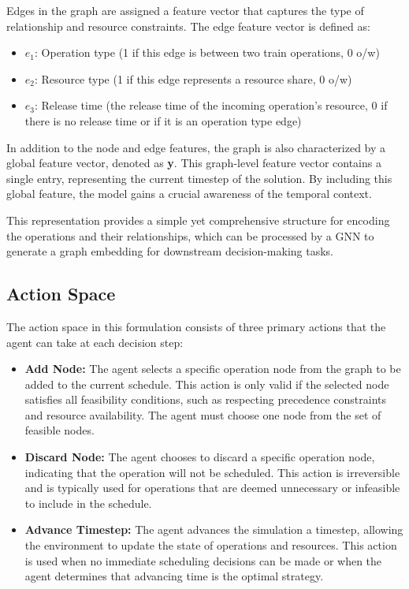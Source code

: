 \documentclass[runningheads]{llncs}
\begin{document}
Edges in the graph are assigned a feature vector that captures the type of relationship and resource constraints. 
The edge feature vector is defined as:
\begin{itemize}
    \item $e_1$: Operation type (1 if this edge is between two train operations, 0 o/w)
    \item $e_2$: Resource type (1 if this edge represents a resource share, 0 o/w)
    \item $e_3$: Release time (the release time of the incoming operation's resource, 0 if there is no release time or if it is an operation type edge)
\end{itemize}

In addition to the node and edge features, the graph is also characterized by a global feature vector, denoted as \textbf{y}. 
This graph-level feature vector contains a single entry, representing the current timestep of the solution. 
By including this global feature, the model gains a crucial awareness of the temporal context.

This representation provides a simple yet comprehensive structure for encoding the operations and their relationships, which can be processed by a GNN to generate a graph embedding for downstream decision-making tasks.

\subsection{Action Space}
\label{sss:action_space}
The action space in this formulation consists of three primary actions that the agent can take at each decision step:

\begin{itemize}
    \item \textbf{Add Node:} The agent selects a specific operation node from the graph to be added to the current schedule. This action is only valid if the selected node satisfies all feasibility conditions, such as respecting precedence constraints and resource availability. The agent must choose one node from the set of feasible nodes.

    \item \textbf{Discard Node:} The agent chooses to discard a specific operation node, indicating that the operation will not be scheduled. This action is irreversible and is typically used for operations that are deemed unnecessary or infeasible to include in the schedule.

    \item \textbf{Advance Timestep:} The agent advances the simulation a timestep, allowing the environment to update the state of operations and resources. This action is used when no immediate scheduling decisions can be made or when the agent determines that advancing time is the optimal strategy.
\end{itemize}
\end{document}
